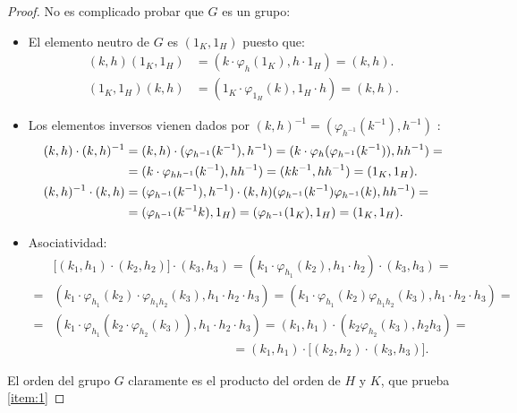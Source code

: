 \begin{proof}
\mbox{}\par 

No es complicado probar que $G$ es un grupo:
\begin{itemize}
    \item El elemento neutro de $G$ es $(1_K, 1_H)$ puesto que:
    \begin{align*}
        (k,h)(1_K, 1_H) &= (k \cdot \varphi_h(1_K), h \cdot 1_H) = (k,h). \\
        (1_K, 1_H)(k,h) &= (1_K \cdot \varphi_{1_H}(k), 1_H \cdot h) = (k,h).
    \end{align*}
    
    \item Los elementos inversos vienen dados por $(k,h)^{-1} = (\varphi_{h^{-1}}(k^{-1}),h^{-1})$ :
    \begin{align*}
        (k,h)\cdot (k,h)^{-1} &= (k,h)\cdot(\varphi_{h^{-1}}(k^{-1}), h^{-1}) = (k \cdot \varphi_h(\varphi_{h^{-1}}(k^{-1})) ,hh^{-1}) = \\
        &=(k\cdot \varphi_{hh^{-1}}(k^{-1}), hh^{-1}) = (kk^{-1},hh^{-1})=(1_K,1_H). \\
        \vspace{0.2cm}
        (k,h)^{-1}\cdot (k,h) &=  (\varphi_{h^{-1}}(k^{-1}), h^{-1}) \cdot (k,h)
        (\varphi_{h^{-1}}(k^{-1})\varphi_{h^{-1}}(k), hh^{-1}) = \\
        &=(\varphi_{h^{-1}}(k^{-1}k), 1_H)  =
        (\varphi_{h^{-1}}(1_K),1_H)=(1_K,1_H).
    \end{align*}
    
    \item Asociatividad:
    \begin{align*}
        &\big[(k_1,h_1)\cdot(k_2,h_2)\big]\cdot (k_3,h_3) 
        = (k_1\cdot \varphi_{h_1}(k_2), h_1\cdot h_2)\cdot(k_3,h_3) = \\
        = &(k_1\cdot \varphi_{h_1}(k_2)\cdot \varphi_{h_1h_2}(k_3) , h_1\cdot h_2\cdot h_3) 
        = (k_1\cdot \varphi_{h_1}(k_2)\varphi_{h_1h_2}(k_3), h_1\cdot h_2\cdot h_3) = \\
        =&(k_1\cdot \varphi_{h_1}(k_2\cdot \varphi_{h_2}(k_3)), h_1\cdot h_2 \cdot h_3) 
        = (k_1,h_1) \cdot (k_2 \varphi_{h_2}(k_3) , h_2h_3) = \\
         & \hspace{6cm} = (k_1,h_1)\cdot \big[(k_2,h_2)\cdot(k_3,h_3)\big].
    \end{align*}
    
\end{itemize}
El orden del grupo $G$ claramente es el producto del orden de $H$ y $K$, que prueba \ref{item:1}


\end{proof}
